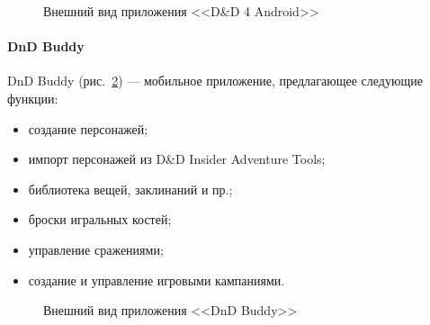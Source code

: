 \begin{figure}[!h]
\begin{minipage}[h]{0.49\linewidth}
\end{minipage}
\caption{Внешний вид приложения <<D\&D 4 Android>>}
\label{ris:dnd_4_android}
\end{figure}


\paragraph{DnD Buddy}
DnD Buddy (рис.~\ref{ris:dnd_buddy}) --- мобильное приложение, предлагающее следующие функции:
\begin{itemize}
\item создание персонажей;
\item импорт персонажей из D\&D Insider Adventure Tools;
\item библиотека вещей, заклинаний и пр.;
\item броски игральных костей;
\item управление сражениями;
\item создание и управление игровыми кампаниями.
\end{itemize}

\begin{figure}[!h]
\caption{Внешний вид приложения <<DnD Buddy>>}
\label{ris:dnd_buddy}
\end{figure}


